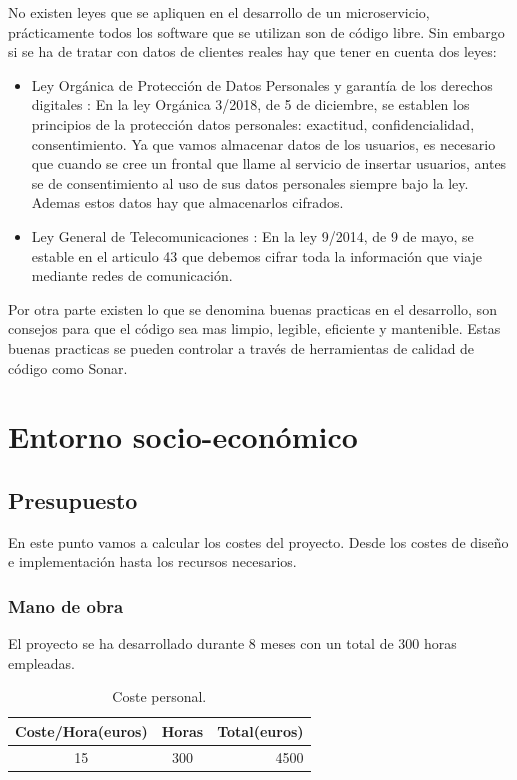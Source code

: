 \documentclass[12pt]{report} %
\begin{document}
No existen leyes que se apliquen en el desarrollo de un microservicio, prácticamente todos los software que se utilizan son de código libre. Sin embargo si se ha de tratar con datos de clientes reales hay que tener en cuenta dos leyes:
\begin{itemize}
	\item Ley Orgánica de Protección de Datos Personales y garantía de los derechos digitales \cite{LeyProteccion}: En la ley Orgánica 3/2018, de 5 de diciembre, se establen los principios de la protección datos personales: exactitud, confidencialidad, consentimiento.  Ya que vamos almacenar datos de los usuarios, es necesario que cuando se cree un frontal que llame al servicio de insertar usuarios, antes se de consentimiento al uso de sus datos personales siempre bajo la ley. Ademas estos datos hay que almacenarlos cifrados.
	\item Ley General de Telecomunicaciones \cite{LeyComunicaciones}: En la ley 9/2014, de 9 de mayo, se estable en el articulo 43 que debemos cifrar toda la información que viaje mediante redes de comunicación. 
\end{itemize}

Por otra parte existen lo que se denomina buenas practicas en el desarrollo, son consejos para que el código sea mas limpio, legible, eficiente y mantenible. Estas buenas practicas se pueden controlar a través de herramientas de calidad de código como Sonar.

\chapter{Entorno socio-económico}	

\section{Presupuesto}
En este punto vamos a calcular los costes del proyecto. Desde los costes de diseño e implementación hasta los recursos necesarios.

\subsection{Mano de obra}

El proyecto se ha desarrollado durante 8 meses con un total de 300 horas empleadas.

\begin{table}[H]
	\begin{center}
		\begin{tabular}{|c|c|r|}
			\hline
			Coste/Hora(euros) & Horas & Total(euros) \\
			\hline \hline
			15 & 300 & 4500 \\ \hline
		
		\end{tabular}
		\caption{Coste personal.}		
		\label{costePersonal}
	\end{center}
\end{table}
\end{document}
